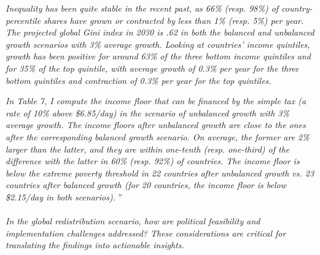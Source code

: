 \documentclass[12pt,english]{article}
\begin{document}
\textit{Inequality has been quite stable in the recent past, as 66\% (resp. 98\%) of country-percentile shares have grown or contracted by less than 1\% (resp. 5\%) per year. The projected global Gini index in 2030 is .62 in both the balanced and unbalanced growth scenarios with 3\% average growth. Looking at countries' income quintiles, growth has been positive for around 63\% of the three bottom income quintiles and for 35\% of the top quintile, with average growth of 0.3\% per year for the three bottom quintiles and contraction of 0.3\% per year for the top quintiles. }

\textit{In Table 7, I compute the income floor that can be financed by the simple tax (a rate of 10\% above \$6.85/day) in the scenario of unbalanced growth with 3\% average growth. 
The income floors after unbalanced growth are close to the ones after the corresponding balanced growth scenario. On average, the former are 2\% larger than the latter, and they are within one-tenth (resp. one-third) of the difference with the latter in 60\% (resp. 92\%) of countries. %
The income floor is below the extreme poverty threshold in 22 countries after unbalanced growth vs. 23 countries after balanced growth (for 20 countries, the income floor is below \$2.15/day in both scenarios). }''
~\\ ~\\

\textit{In the global redistribution scenario, how are political feasibility and implementation challenges addressed? These considerations are critical for translating the findings into actionable insights. }~\\
\end{document}
